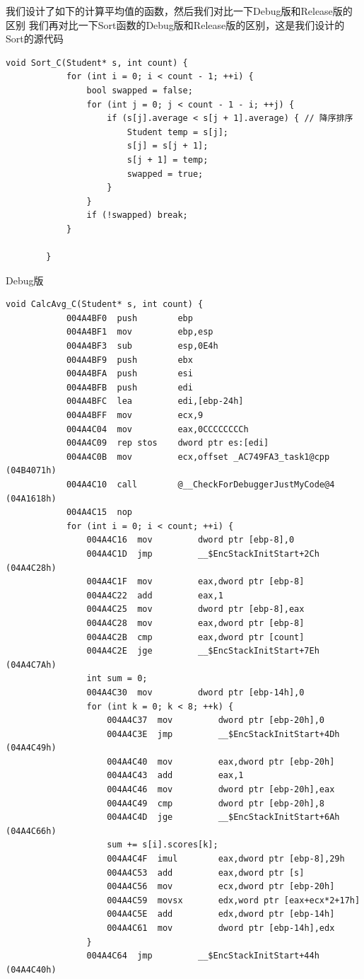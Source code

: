 \documentclass[supercite]{Experimental_Report}
\theoremstyle{definition}
\begin{document}
	我们设计了如下的计算平均值的函数，然后我们对比一下Debug版和Release版的区别
	我们再对比一下Sort函数的Debug版和Release版的区别，这是我们设计的Sort的源代码
	\begin{lstlisting}[style=commonCodeStyle, caption={sort.cpp}, label={lst:2-4}]
		void Sort_C(Student* s, int count) {
			for (int i = 0; i < count - 1; ++i) {
				bool swapped = false;
				for (int j = 0; j < count - 1 - i; ++j) {
					if (s[j].average < s[j + 1].average) { // 降序排序
						Student temp = s[j];
						s[j] = s[j + 1];
						s[j + 1] = temp;
						swapped = true;
					}
				}
				if (!swapped) break; 
			}
			
		} 
	\end{lstlisting}
	Debug版
	\begin{lstlisting}[style=commonCodeStyle, caption={debug.asm}, label={lst:2-5}]
		void CalcAvg_C(Student* s, int count) {
			004A4BF0  push        ebp  
			004A4BF1  mov         ebp,esp  
			004A4BF3  sub         esp,0E4h  
			004A4BF9  push        ebx  
			004A4BFA  push        esi  
			004A4BFB  push        edi  
			004A4BFC  lea         edi,[ebp-24h]  
			004A4BFF  mov         ecx,9  
			004A4C04  mov         eax,0CCCCCCCCh  
			004A4C09  rep stos    dword ptr es:[edi]  
			004A4C0B  mov         ecx,offset _AC749FA3_task1@cpp (04B4071h)  
			004A4C10  call        @__CheckForDebuggerJustMyCode@4 (04A1618h)  
			004A4C15  nop  
			for (int i = 0; i < count; ++i) {
				004A4C16  mov         dword ptr [ebp-8],0  
				004A4C1D  jmp         __$EncStackInitStart+2Ch (04A4C28h)  
				004A4C1F  mov         eax,dword ptr [ebp-8]  
				004A4C22  add         eax,1  
				004A4C25  mov         dword ptr [ebp-8],eax  
				004A4C28  mov         eax,dword ptr [ebp-8]  
				004A4C2B  cmp         eax,dword ptr [count]  
				004A4C2E  jge         __$EncStackInitStart+7Eh (04A4C7Ah)  
				int sum = 0;
				004A4C30  mov         dword ptr [ebp-14h],0  
				for (int k = 0; k < 8; ++k) {
					004A4C37  mov         dword ptr [ebp-20h],0  
					004A4C3E  jmp         __$EncStackInitStart+4Dh (04A4C49h)  
					004A4C40  mov         eax,dword ptr [ebp-20h]  
					004A4C43  add         eax,1  
					004A4C46  mov         dword ptr [ebp-20h],eax  
					004A4C49  cmp         dword ptr [ebp-20h],8  
					004A4C4D  jge         __$EncStackInitStart+6Ah (04A4C66h)  
					sum += s[i].scores[k];
					004A4C4F  imul        eax,dword ptr [ebp-8],29h  
					004A4C53  add         eax,dword ptr [s]  
					004A4C56  mov         ecx,dword ptr [ebp-20h]  
					004A4C59  movsx       edx,word ptr [eax+ecx*2+17h]  
					004A4C5E  add         edx,dword ptr [ebp-14h]  
					004A4C61  mov         dword ptr [ebp-14h],edx  
				}
				004A4C64  jmp         __$EncStackInitStart+44h (04A4C40h)  
				

\end{lstlisting}
\end{document}
